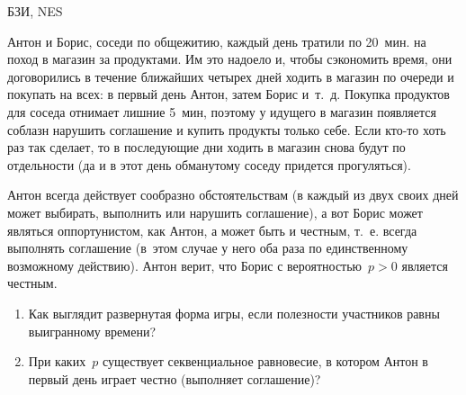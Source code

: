 \begin{problem}[Соседи.]\begin{source}
БЗИ, NES
\end{source} Антон и Борис, соседи по общежитию,
каждый день тратили по 20~мин. на поход в магазин за
продуктами. Им это надоело и, чтобы сэкономить время, они
договорились в течение ближайших четырех дней ходить в
магазин по очереди и покупать на всех: в первый день Антон,
затем Борис и~т.~д. Покупка продуктов для соседа отнимает
лишние 5~мин, поэтому у идущего в магазин появляется
соблазн нарушить соглашение и купить продукты только себе.
Если кто-то хоть раз так сделает, то в последующие дни
ходить в магазин снова будут по отдельности (да и в этот
день обманутому соседу придется прогуляться).

Антон всегда действует сообразно обстоятельствам (в каждый
из двух своих дней может выбирать, выполнить или нарушить
соглашение), а вот Борис может являться оппортунистом, как
Антон, а может быть и честным, т.~е. всегда выполнять
соглашение (в~этом случае у него оба раза по единственному
возможному действию). Антон верит, что Борис с
вероятностью~$p>0$ является честным.

\begin{enumerate}
  \item Как выглядит развернутая форма игры, если полезности
  участников равны выигранному времени?
  \item При каких~$p$ существует секвенциальное  равновесие,
  в котором Антон в первый день играет честно (выполняет
  соглашение)?
\end{enumerate}






\begin{sol}

\end{sol}
\end{problem}




